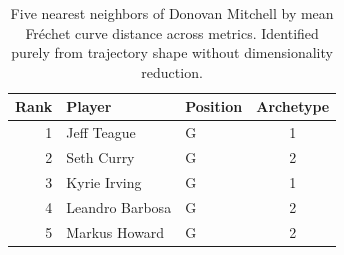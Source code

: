 \begin{table}[htbp]
  \centering\small
  \begin{tabular}{rllc}
    \toprule
    Rank & Player & Position & Archetype \\
    \midrule
    1 & Jeff Teague & G & 1 \\
    2 & Seth Curry & G & 2 \\
    3 & Kyrie Irving & G & 1 \\
    4 & Leandro Barbosa & G & 2 \\
    5 & Markus Howard & G & 2 \\
    \bottomrule
  \end{tabular}
  \caption{Five nearest neighbors of Donovan Mitchell by mean Fr\'{e}chet curve distance across metrics. Identified purely from trajectory shape without dimensionality reduction.}
  \label{tab:Donovan_Mitchell_frechet_curve_neighbors}
\end{table}

